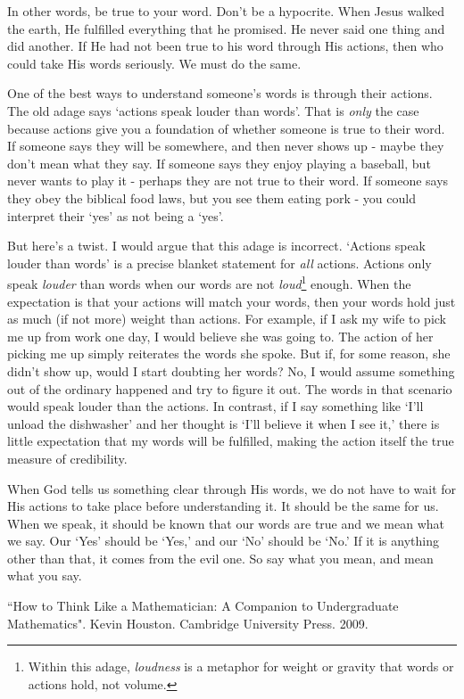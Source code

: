 \documentclass[10pt]{article}
\begin{document}
\begin{multicols}{2}
In other words, be true to your word. Don't be a hypocrite. When Jesus walked the earth, He fulfilled everything that he promised. He never said one thing and did another. If He had not been true to his word through His actions, then who could take His words seriously. We must do the same. 

One of the best ways to understand someone's words is through their actions. The old adage says `actions speak louder than words'. That is \textit{only} the case because actions give you a foundation of whether someone is true to their word. If someone says they will be somewhere, and then never shows up - maybe they don't mean what they say. If someone says they enjoy playing a baseball, but never wants to play it - perhaps they are not true to their word. If someone says they obey the biblical food laws, but you see them eating pork - you could interpret their `yes' as not being a `yes'.

But here's a twist. I would argue that this adage is incorrect. `Actions speak louder than words' is a precise blanket statement for \textit{all} actions. Actions only speak \textit{louder} than words when our words are not \textit{loud}\footnote{Within this adage, \textit{loudness} is a metaphor for weight or gravity that words or actions hold, not volume.} enough. When the expectation is that your actions will match your words, then your words hold just as much (if not more) weight than actions. For example, if I ask my wife to pick me up from work one day, I would believe she was going to. The action of her picking me up simply reiterates the words she spoke. But if, for some reason, she didn't show up, would I start doubting her words? No, I would assume something out of the ordinary happened and try to figure it out. The words in that scenario would speak louder than the actions. In contrast, if I say something like `I'll unload the dishwasher' and her thought is `I'll believe it when I see it,' there is little expectation that my words will be fulfilled, making the action itself the true measure of credibility.

When God tells us something clear through His words, we do not have to wait for His actions to take place before understanding it. It should be the same for us. When we speak, it should be known that our words are true and we mean what we say. Our `Yes’ should be `Yes,’ and our `No’ should be `No.’ If it is anything other than that, it comes from the evil one. So say what you mean, and mean what you say.



\begin{thebibliography}{9}
	{\footnotesize
	 ``How to Think Like a Mathematician: A Companion to Undergraduate Mathematics". Kevin Houston. Cambridge University Press. 2009.

	}
\end{thebibliography}

\end{multicols}


\end{document}
